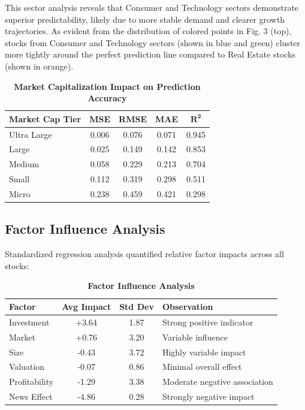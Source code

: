 \documentclass[3p,times,procedia]{elsarticle}
\begin{document}
This sector analysis reveals that Consumer and Technology sectors demonstrate superior predictability, likely due to more stable demand and clearer growth trajectories. As evident from the distribution of colored points in Fig. 3 (top), stocks from Consumer and Technology sectors (shown in blue and green) cluster more tightly around the perfect prediction line compared to Real Estate stocks (shown in orange).

\begin{table}[!ht]\footnotesize
\centering
\caption{\textbf{Market Capitalization Impact on Prediction Accuracy}}
\begin{tabular}{|l|c|c|c|c|}
\hline
\textbf{Market Cap Tier} & \textbf{MSE} & \textbf{RMSE} & \textbf{MAE} & \textbf{$\mathbf{R^2}$} \\
\hline
Ultra Large & 0.006 & 0.076 & 0.071 & 0.945 \\
Large       & 0.025 & 0.149 & 0.142 & 0.853 \\
Medium      & 0.058 & 0.229 & 0.213 & 0.704 \\
Small       & 0.112 & 0.319 & 0.298 & 0.511 \\
Micro       & 0.238 & 0.459 & 0.421 & 0.298 \\
\hline
\end{tabular}
\end{table}


\subsection{Factor Influence Analysis}
\vspace{-2pt}
Standardized regression analysis quantified relative factor impacts across all stocks:

\begin{table}[H]\footnotesize
\centering
\caption{\textbf{Factor Influence Analysis}}
\renewcommand{\arraystretch}{1.1}
\begin{tabular}{|l|c|c|l|}
\hline
\textbf{Factor} & \textbf{Avg Impact} & \textbf{Std Dev} & \textbf{Observation} \\
\hline
Investment     & +3.64 & 1.87 & Strong positive indicator \\
Market         & +0.76 & 3.20 & Variable influence \\
Size           & -0.43 & 3.72 & Highly variable impact \\
Valuation      & -0.07 & 0.86 & Minimal overall effect \\
Profitability  & -1.29 & 3.38 & Moderate negative association \\
News Effect    & -4.86 & 0.28 & Strongly negative impact \\
\hline
\end{tabular}
\end{table}
\end{document}
